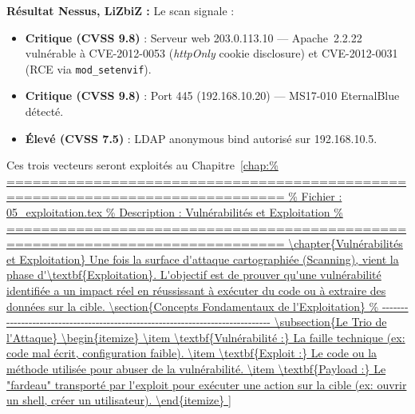 \begin{boxlizbiz}
\textbf{Résultat Nessus, LiZbiZ :}
Le scan signale :
\begin{itemize}
    \item \textbf{Critique (CVSS 9.8)} : Serveur web 203.0.113.10 —
          Apache~2.2.22 vulnérable à CVE-2012-0053 (\textit{httpOnly} cookie
          disclosure) et CVE-2012-0031 (RCE via \texttt{mod\_setenvif}).
    \item \textbf{Critique (CVSS 9.8)} : Port 445 (192.168.10.20) —
          MS17-010 EternalBlue détecté.
    \item \textbf{Élevé (CVSS 7.5)} : LDAP anonymous bind autorisé sur
          192.168.10.5.
\end{itemize}
Ces trois vecteurs seront exploités au Chapitre~\ref{chap:%

\chapter{Vulnérabilités et Exploitation}

Une fois la surface d'attaque cartographiée (Scanning), vient la phase d'\textbf{Exploitation}. L'objectif est de prouver qu'une vulnérabilité identifiée a un impact réel en réussissant à exécuter du code ou à extraire des données sur la cible.

\section{Concepts Fondamentaux de l'Exploitation}

\subsection{Le Trio de l'Attaque}

\begin{itemize}
    \item \textbf{Vulnérabilité :} La faille technique (ex: code mal écrit, configuration faible).
    \item \textbf{Exploit :} Le code ou la méthode utilisée pour abuser de la vulnérabilité.
    \item \textbf{Payload :} Le "fardeau" transporté par l'exploit pour exécuter une action sur la cible (ex: ouvrir un shell, créer un utilisateur).
\end{itemize}

}
\end{boxlizbiz}
